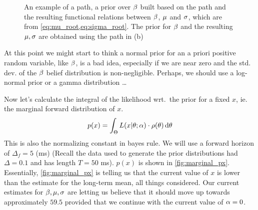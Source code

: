 \documentclass{article}
\begin{document}
\begin{figure}[h]
\begin{center}
\caption[labelInTOC]{An example of a path, a prior over ${\beta}$ built based on
the path and the resulting functional relations between ${\beta}$, ${\mu }$ and ${\sigma }$,
which are from \cref{eq:mu_root,eq:sigma_root}. The prior for ${\beta}$ and the
resulting ${\mu },{\sigma }$ are obtained using the path in (b)}
\label{fig:prior_mu_sigma}
\end{center}
\end{figure}
At this point we might start to think a normal prior for an a priori positive
random variable, like ${\beta}$, is a bad idea, especially if we are near zero and the std.
dev. of the ${\beta}$ belief distribution is non-negligible. Perhaps, we should use
a log-normal prior or a gamma distribution \ldots


Now let's calculate the integral of the likelihood wrt.\ the prior for a fixed
$x$, ie. the marginal forward distribution of $x$. $$ p(x) = \int_\Theta
L(x|{\theta};{\alpha})\cdot \rho({\theta}) \, \mathrm{d} {\theta} $$ This is also the normalizing constant
in bayes rule. We will use a forward horizon of  $\Delta_f = 5$ (ms) (Recall the
data used to generate the prior distributions had $\Delta = 0.1$ and has length
$T = 50$ ms). $p(x)$ is shown in \cref{fig:marginal_px}. Essentially,
\cref{fig:marginal_px} is telling us that the current value of $x$ is lower than
the estimate for the long-term mean, all things considered. Our current
estimates for ${\beta}, {\mu }, {\sigma }$ are letting us believe that it should move up
towards approximately $59.5$ provided that we continue with the
current value of ${\alpha}=0$. 
\end{document}
